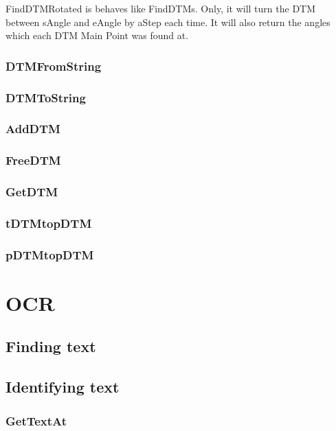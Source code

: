 \documentclass[a4paper]{report}
\begin{document}
{FindDTMRotated is behaves like FindDTMs. Only, it will turn the DTM between 
sAngle and eAngle by aStep each time. It will also return the angles which each DTM Main Point 
was found at.

\subsection{DTMFromString}

\subsection{DTMToString}

\subsection{AddDTM}

\subsection{FreeDTM}

\subsection{GetDTM}

\subsection{tDTMtopDTM}

\subsection{pDTMtopDTM}


\chapter{OCR}

\section{Finding text}

\section{Identifying text}

\subsection{GetTextAt}

}
\end{document}

